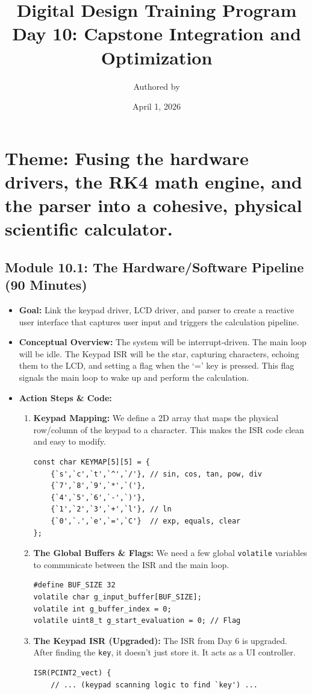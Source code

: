 \documentclass[11pt,a4paper]{article}
\title{Digital Design Training Program \\ \large Day 10: Capstone Integration and Optimization}
\author{Authored by }
\date{April 1, 2026}
\begin{document}
\maketitle

\section*{Theme: Fusing the hardware drivers, the RK4 math engine, and the parser into a cohesive, physical scientific calculator.}

\subsection*{Module 10.1: The Hardware/Software Pipeline (90 Minutes)}

\begin{itemize}
    \item \textbf{Goal:} Link the keypad driver, LCD driver, and parser to create a reactive user interface that captures user input and triggers the calculation pipeline.
    \item \textbf{Conceptual Overview:} The system will be interrupt-driven. The main loop will be idle. The Keypad ISR will be the star, capturing characters, echoing them to the LCD, and setting a flag when the `=' key is pressed. This flag signals the main loop to wake up and perform the calculation.
    \item \textbf{Action Steps \& Code:}
    \begin{enumerate}
        \item \textbf{Keypad Mapping:} We define a 2D array that maps the physical row/column of the keypad to a character. This makes the ISR code clean and easy to modify.
\begin{lstlisting}
const char KEYMAP[5][5] = {
    {`s',`c',`t',`^',`/'}, // sin, cos, tan, pow, div
    {`7',`8',`9',`*',`('},
    {`4',`5',`6',`-',`)'},
    {`1',`2',`3',`+',`l'}, // ln
    {`0',`.',`e',`=',`C'}  // exp, equals, clear
};
\end{lstlisting}
        \item \textbf{The Global Buffers \& Flags:} We need a few global \verb|volatile| variables to communicate between the ISR and the main loop.
\begin{lstlisting}
#define BUF_SIZE 32
volatile char g_input_buffer[BUF_SIZE];
volatile int g_buffer_index = 0;
volatile uint8_t g_start_evaluation = 0; // Flag
\end{lstlisting}
        \item \textbf{The Keypad ISR (Upgraded):} The ISR from Day 6 is upgraded. After finding the \verb|key|, it doesn't just store it. It acts as a UI controller.
\begin{lstlisting}
ISR(PCINT2_vect) {
    // ... (keypad scanning logic to find `key') ...
    

\end{lstlisting}
\end{enumerate}
\end{itemize}
\end{document}
